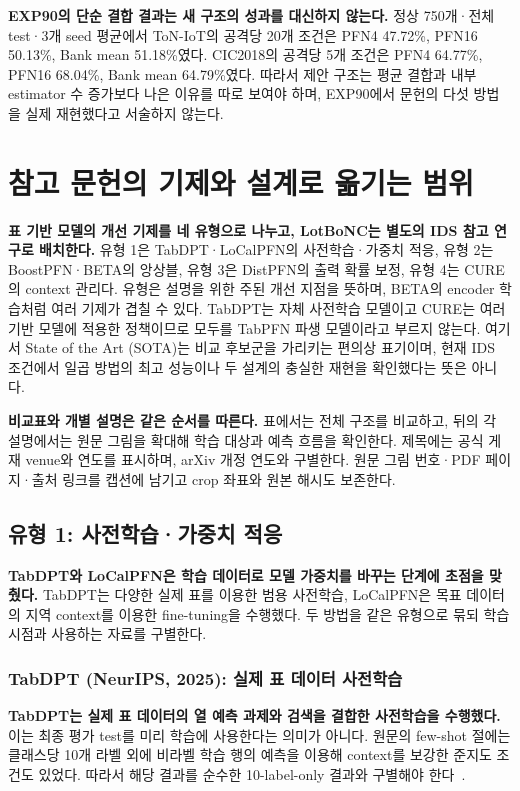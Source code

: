 \textbf{EXP90의 단순 결합 결과는 새 구조의 성과를 대신하지 않는다.} 정상 750개·전체 test·3개 seed 평균에서 ToN-IoT의 공격당 20개 조건은 PFN4 47.72\%, PFN16 50.13\%, Bank mean 51.18\%였다. CIC2018의 공격당 5개 조건은 PFN4 64.77\%, PFN16 68.04\%, Bank mean 64.79\%였다. 따라서 제안 구조는 평균 결합과 내부 estimator 수 증가보다 나은 이유를 따로 보여야 하며, EXP90에서 문헌의 다섯 방법을 실제 재현했다고 서술하지 않는다.

\section{참고 문헌의 기제와 설계로 옮기는 범위}
\textbf{표 기반 모델의 개선 기제를 네 유형으로 나누고, LotBoNC는 별도의 IDS 참고 연구로 배치한다.} 유형 1은 TabDPT·LoCalPFN의 사전학습·가중치 적응, 유형 2는 BoostPFN·BETA의 앙상블, 유형 3은 DistPFN의 출력 확률 보정, 유형 4는 CURE의 context 관리다. 유형은 설명을 위한 주된 개선 지점을 뜻하며, BETA의 encoder 학습처럼 여러 기제가 겹칠 수 있다. TabDPT는 자체 사전학습 모델이고 CURE는 여러 기반 모델에 적용한 정책이므로 모두를 TabPFN 파생 모델이라고 부르지 않는다. 여기서 State of the Art (SOTA)는 비교 후보군을 가리키는 편의상 표기이며, 현재 IDS 조건에서 일곱 방법의 최고 성능이나 두 설계의 충실한 재현을 확인했다는 뜻은 아니다.

\textbf{비교표와 개별 설명은 같은 순서를 따른다.} 표에서는 전체 구조를 비교하고, 뒤의 각 설명에서는 원문 그림을 확대해 학습 대상과 예측 흐름을 확인한다. 제목에는 공식 게재 venue와 연도를 표시하며, arXiv 개정 연도와 구별한다. 원문 그림 번호·PDF 페이지·출처 링크를 캡션에 남기고 crop 좌표와 원본 해시도 보존한다.


\clearpage
\subsection{유형 1: 사전학습·가중치 적응}
\textbf{TabDPT와 LoCalPFN은 학습 데이터로 모델 가중치를 바꾸는 단계에 초점을 맞췄다.} TabDPT는 다양한 실제 표를 이용한 범용 사전학습, LoCalPFN은 목표 데이터의 지역 context를 이용한 fine-tuning을 수행했다. 두 방법을 같은 유형으로 묶되 학습 시점과 사용하는 자료를 구별한다.

\subsubsection{TabDPT (NeurIPS, 2025): 실제 표 데이터 사전학습}
\textbf{TabDPT는 실제 표 데이터의 열 예측 과제와 검색을 결합한 사전학습을 수행했다.} 이는 최종 평가 test를 미리 학습에 사용한다는 의미가 아니다. 원문의 few-shot 절에는 클래스당 10개 라벨 외에 비라벨 학습 행의 예측을 이용해 context를 보강한 준지도 조건도 있었다. 따라서 해당 결과를 순수한 10-label-only 결과와 구별해야 한다~\cite{tabdpt}.

